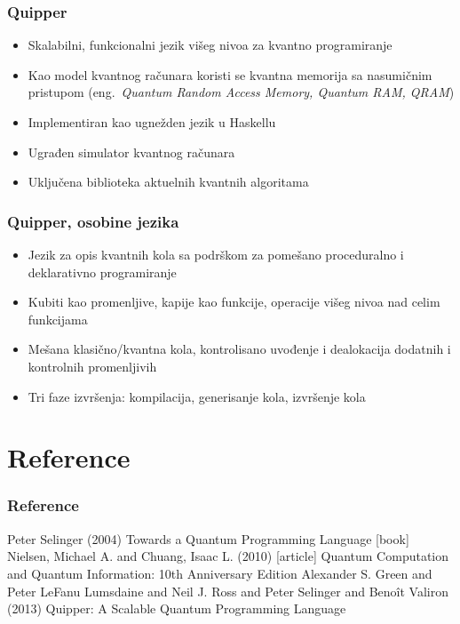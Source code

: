 \documentclass[12pt,hyperref={unicode}]{beamer}
\begin{document}
\begin{frame}
\frametitle{Quipper}
\begin{itemize}
\item{Skalabilni, funkcionalni jezik višeg nivoa za kvantno programiranje \cite{p3}}
\item{Kao model kvantnog računara koristi se kvantna memorija sa nasumičnim pristupom (eng.~\emph{Quantum Random Access Memory, Quantum RAM, QRAM}})
\item{Implementiran kao ugnežden jezik u Haskellu}
\item{Ugrađen simulator kvantnog računara}
\item{Uključena biblioteka aktuelnih kvantnih algoritama}
\end{itemize}
\end{frame}
\begin{frame}
\frametitle{Quipper, osobine jezika}
\begin{itemize}
\item{Jezik za opis kvantnih kola sa podrškom za pomešano proceduralno i deklarativno programiranje}
\item{Kubiti kao promenljive, kapije kao funkcije, operacije višeg nivoa nad celim funkcijama}
\item{Mešana klasično/kvantna kola, kontrolisano uvođenje i dealokacija dodatnih i kontrolnih promenljivih}
\item{Tri faze izvršenja: kompilacija, generisanje kola, izvršenje kola}
\end{itemize}
\end{frame}

\section{Reference}

\begin{frame}
\frametitle{Reference}
\footnotesize{
\begin{thebibliography}{99} %
 Peter Selinger (2004)
\newblock Towards a Quantum Programming Language
[book]
 Nielsen, Michael A. and Chuang, Isaac L. (2010)
[article]
\newblock Quantum Computation and Quantum Information: 10th Anniversary Edition
 Alexander S. Green and Peter LeFanu Lumsdaine and Neil J. Ross and Peter Selinger and Benoît Valiron (2013)
\newblock Quipper: A Scalable Quantum Programming Language

\end{thebibliography}
}
\end{frame}

\end{document}
